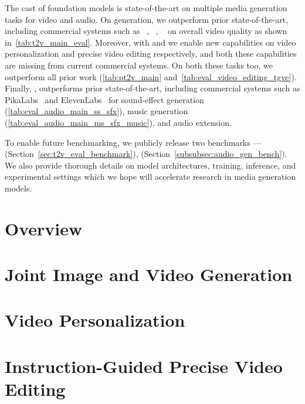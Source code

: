 \documentclass[]{fairmeta}
\begin{document}
The \OURS cast of foundation models is state-of-the-art on multiple media generation tasks for video and audio.
On \textToV generation, we outperform prior state-of-the-art, including commercial systems such as \RunwayGen~\citep{gen3}, \LumaLabs~\citep{luma}, \Sora~\citep{sora} on overall video quality as shown in~\cref{tab:t2v_main_eval}.
Moreover, with \OursPTV and \OursVideoEdit we enable new capabilities on video personalization and precise video editing respectively, and both these capabilities are missing from current commercial systems.
On both these tasks too, we outperform all prior work (\cref{tab:pt2v_main} and~\cref{tab:eval_video_editing_tgve}).
Finally, \OursAudio, outperforms prior state-of-the-art, including commercial systems such as PikaLabs~\citep{pikalabs} and ElevenLabs~\citep{elevenlabs} for sound-effect generation (\cref{tab:eval_audio_main_ss_sfx}), music generation (\cref{tab:eval_audio_main_ms_sfx_music}), and audio extension.

To enable future benchmarking, we publicly release two benchmarks ---\textToVBenchmarkName (Section~\ref{sec:t2v_eval_benchmark}), \OursAudioBench (Section~\ref{subsubsec:audio_gen_bench}).
We also provide thorough details on model architectures, training, inference, and experimental settings which we hope will accelerate research in media generation models.


\section{Overview}


\section{Joint Image and Video Generation}
\label{sec:image_video_model}










\section{Video Personalization}%
\label{sec:personalization}





\section{Instruction-Guided Precise Video Editing}
\label{sec:video_editing}

\end{document}
